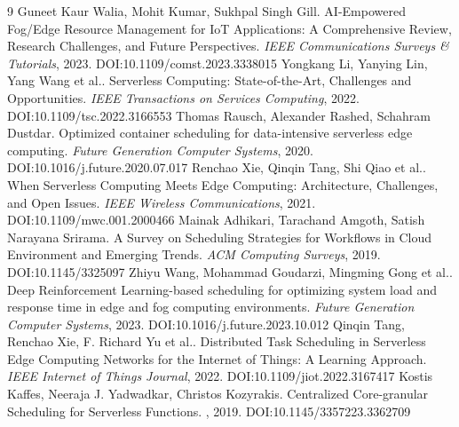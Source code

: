 \documentclass[11pt]{article}
\begin{document}
\begin{thebibliography}{9}
 Guneet Kaur Walia, Mohit Kumar, Sukhpal Singh Gill. AI-Empowered Fog/Edge Resource Management for IoT Applications: A Comprehensive Review, Research Challenges, and Future Perspectives. \emph{IEEE Communications Surveys \& Tutorials}, 2023. DOI:10.1109/comst.2023.3338015
 Yongkang Li, Yanying Lin, Yang Wang et al.. Serverless Computing: State-of-the-Art, Challenges and Opportunities. \emph{IEEE Transactions on Services Computing}, 2022. DOI:10.1109/tsc.2022.3166553
 Thomas Rausch, Alexander Rashed, Schahram Dustdar. Optimized container scheduling for data-intensive serverless edge computing. \emph{Future Generation Computer Systems}, 2020. DOI:10.1016/j.future.2020.07.017
 Renchao Xie, Qinqin Tang, Shi Qiao et al.. When Serverless Computing Meets Edge Computing: Architecture, Challenges, and Open Issues. \emph{IEEE Wireless Communications}, 2021. DOI:10.1109/mwc.001.2000466
 Mainak Adhikari, Tarachand Amgoth, Satish Narayana Srirama. A Survey on Scheduling Strategies for Workflows in Cloud Environment and Emerging Trends. \emph{ACM Computing Surveys}, 2019. DOI:10.1145/3325097
 Zhiyu Wang, Mohammad Goudarzi, Mingming Gong et al.. Deep Reinforcement Learning-based scheduling for optimizing system load and response time in edge and fog computing environments. \emph{Future Generation Computer Systems}, 2023. DOI:10.1016/j.future.2023.10.012
 Qinqin Tang, Renchao Xie, F. Richard Yu et al.. Distributed Task Scheduling in Serverless Edge Computing Networks for the Internet of Things: A Learning Approach. \emph{IEEE Internet of Things Journal}, 2022. DOI:10.1109/jiot.2022.3167417
 Kostis Kaffes, Neeraja J. Yadwadkar, Christos Kozyrakis. Centralized Core-granular Scheduling for Serverless Functions. \emph{}, 2019. DOI:10.1145/3357223.3362709
\end{thebibliography}
\end{document}
